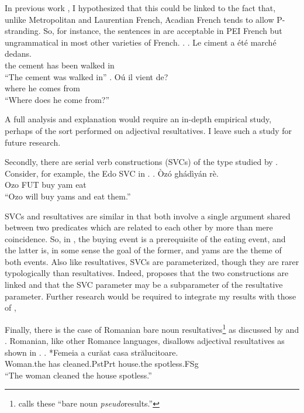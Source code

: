 In previous work \parencite{milway2015generals}, I hypothesized that this could be linked to the fact that, unlike Metropolitan and Laurentian French, Acadian French tends to allow P-stranding.
So, for instance, the sentences in \Next are acceptable in PEI French but ungrammatical in most other varieties of French.
\ex.
\ag. Le ciment a \'{e}t\'{e} march\'{e} dedans.\\
the cement has been walked in\\
``The cement was walked in''
\bg. O\'{u} il vient de?\\
where he comes from\\
``Where does he come from?'' \parencite{roberge2013preposition}

A full analysis and explanation would require an in-depth empirical study, perhaps of the sort \textcite{snyder1995language} performed on adjectival resultatives.
I leave such a study for future research.

Secondly, there are serial verb constructions (SVCs) of the type studied by \textcite{stewart2013serial,bakerstewart1999double}.
Consider, for example, the Edo SVC in \Next.
\exg. \`{O}z\'{o}  gh\'{a}d\`{i}y\'{a}n    r\`{e}.\\
Ozo  FUT   buy   yam    eat\\
``Ozo will buy yams and eat them.'' \parencite{bakerstewart1999double}

SVCs and resultatives are similar in that both involve a single argument shared between two predicates which are related to each other by more than mere coincidence.
So, in \Last, the buying event is a prerequisite of the eating event, and the latter is, in some sense the goal of the former, and yams are the theme of both events.
Also like resultatives, SVCs are parameterized, though they are rarer typologically than resultatives.
Indeed, \textcite{stewart2013serial} proposes that the two constructions are linked and that the SVC parameter may be a subparameter of the resultative parameter.
Further research would be required to integrate my results with those of \textcite{stewart2013serial,bakerstewart1999double},

Finally, there is the case of Romanian bare noun resultatives\footnote{\textcite{irimia2012secondary} calls these ``bare noun \textit{pseudo}results.''} as discussed by \textcite[220--224]{irimia2012secondary} and \textcite{farkas2011predicative}.
Romanian, like other Romance languages, disallows adjectival resultatives as shown in \Next.
\exg. *Femeia a cur\u{a}at casa str\u{a}lucitoare.\footnotemark\\
Woman.the has cleaned.PstPrt house.the spotless.FSg\\
``The woman cleaned the house spotless.''\parencite{irimia2012secondary}

